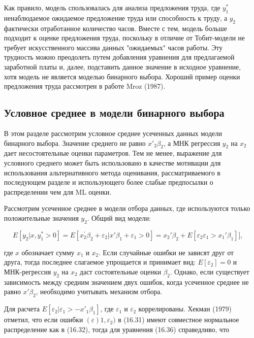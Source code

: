 Как правило, модель спользовалась для анализа предложения труда, где $y^{*}_1$ ненаблюдаемое ожидаемое предложение труда или способность к труду, а $y_2$ фактически отработанное количество часов. Вместе с тем, модель больше подходит к оценке предложения труда, поскольку в отличие от Тобит-модели не требует искусственного массива данных "ожидаемых" часов работы. 
Эту трудность можно преодолеть путем добавления уравнения для предлагаемой заработной платы и, далее, подставить данное значение в исходное уравнение, хотя модель не является моделью бинарного выбора. Хороший пример оценки предложения труда рассмотрен в работе Mroz (1987).

\subsection{Условное среднее в модели бинарного выбора}

В этом разделе рассмотрим условное среднее усеченных данных модели бинарного выбора. Значение среднего не равно $x'_{2}\beta_2$, а МНК регрессия $y_2$ на $x_2$ дает несостоятельные оценки параметров. Тем не менее, выражение для условного среднего может быть использовано в качестве мотивации для использования альтернативного метода оценивания, рассматриваемого в последующем разделе и использующего более слабые предпосылки о распределении чем для ML оценки. 

Рассмотрим усеченное среднее в модели отбора данных, где используются только положительные значения $y_2$. Общий вид модели:

\begin{equation}
E[y_2|x,y_1^{\ast}>0]=E[x_2^{\prime}\beta_2+\varepsilon_2|x'\beta_1+\varepsilon_1>0] = x_2'\beta_2+E[\varepsilon_2\varepsilon_1>x_1'\beta_1]],
\end{equation}

где $x$ обозначает сумму $x_1$ и $x_2$. Если случайные ошибки не зависят друг от друга, тогда последнее слагаемое упрощается и принимает вид: $E[\varepsilon_2]=0$ и МНК-регрессия $y_2$ на $x_2$ даст состоятельные оценки $\beta_2$. Однако, если существует зависимость между средним значением двух ошибок, когда усеченное среднее не равно $x'\beta_2$, необходимо учитывать механизм отбора. 

Для расчета $E[\varepsilon_2|\varepsilon_1>-{x'}_1\beta_1]$, где $\varepsilon_1$ и $\varepsilon_2$ коррелированы. Хекман (1979) отметил, что если ошибки $(\varepsilon)1,\varepsilon_2)$ в (16.31) имеют совместное нормальное распределение как в (16.32), тогда для уравнения (16.36) справедливо, что 

